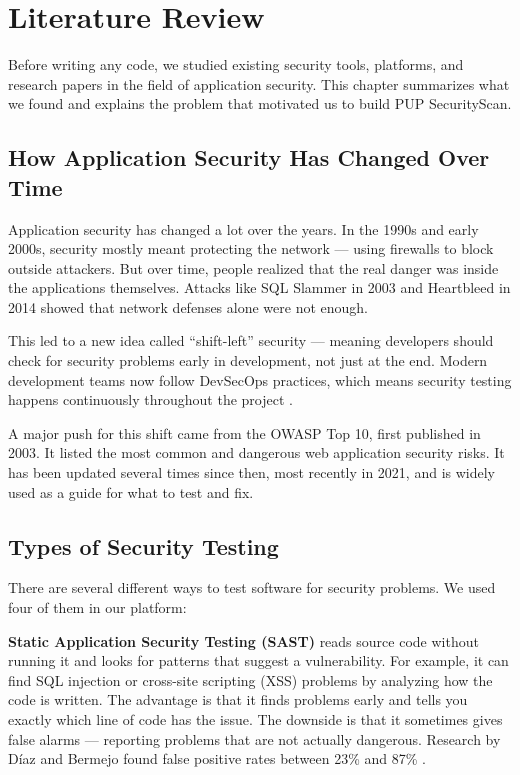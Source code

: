 \documentclass[12pt,a4paper]{report}
\begin{document}
\chapter{Literature Review}
\label{chap:literature}

Before writing any code, we studied existing security tools, platforms, and research papers in the field of application security. This chapter summarizes what we found and explains the problem that motivated us to build PUP SecurityScan.

\section{How Application Security Has Changed Over Time}

Application security has changed a lot over the years. In the 1990s and early 2000s, security mostly meant protecting the network --- using firewalls to block outside attackers. But over time, people realized that the real danger was inside the applications themselves. Attacks like SQL Slammer in 2003 and Heartbleed in 2014 showed that network defenses alone were not enough.

This led to a new idea called ``shift-left'' security --- meaning developers should check for security problems early in development, not just at the end. Modern development teams now follow DevSecOps practices, which means security testing happens continuously throughout the project \cite{gitlab2023}.

A major push for this shift came from the OWASP Top 10, first published in 2003. It listed the most common and dangerous web application security risks. It has been updated several times since then, most recently in 2021, and is widely used as a guide for what to test and fix.

\section{Types of Security Testing}

There are several different ways to test software for security problems. We used four of them in our platform:

\textbf{Static Application Security Testing (SAST)} reads source code without running it and looks for patterns that suggest a vulnerability. For example, it can find SQL injection or cross-site scripting (XSS) problems by analyzing how the code is written. The advantage is that it finds problems early and tells you exactly which line of code has the issue. The downside is that it sometimes gives false alarms --- reporting problems that are not actually dangerous. Research by D\'iaz and Bermejo found false positive rates between 23\% and 87\% \cite{diaz2013}.
\end{document}
